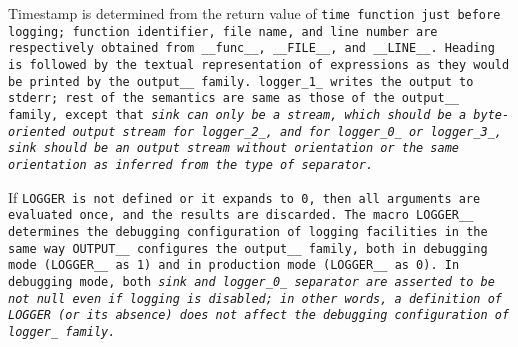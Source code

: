 Timestamp is determined from the return value of \tt{time} function
just before logging; function identifier, file name, and line number are
respectively obtained from \tt{__func__}, \tt{__FILE__}, and \tt{__LINE__}.
Heading is followed by the textual representation of
expressions as they would be printed by the \tt{output__} family.
\tt{logger_1_} writes the output to \tt{stderr}; rest of the semantics are same
as those of the \tt{output__} family, except that \it{sink} can only be a stream,
which should be a byte-oriented output stream for \tt{logger_2_}, and for
\tt{logger_0_} or \tt{logger_3_}, \it{sink} should be an output stream without
orientation or the same orientation as inferred from the type of \it{separator}.

If \tt{LOGGER} is not defined or it expands to \tt{0},
then all arguments are evaluated once, and the results are discarded.
The macro \tt{LOGGER__} determines the debugging configuration of logging
facilities in the same way \tt{OUTPUT__} configures the \tt{output__} family,
both in debugging mode (\tt{LOGGER__} as \tt{1})
and in production mode (\tt{LOGGER__} as \tt{0}).
In debugging mode, both \it{sink} and \tt{logger_0_} \it{separator}
are asserted to be not null even if logging is disabled;
in other words, a definition of \tt{LOGGER} (or its absence) does
not affect the debugging configuration of \tt{logger_} family.
